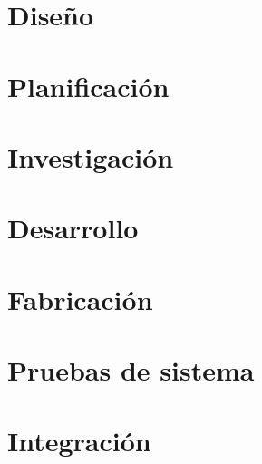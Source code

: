 \documentclass[
11pt, %
]{charter}
\begin{document}
\section{Diseño}
\section{Planificación}
\section{Investigación}
\section{Desarrollo}
\section{Fabricación}
\section{Pruebas de sistema}
\section{Integración}
\end{document}
